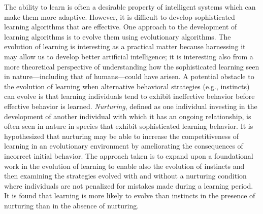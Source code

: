 The ability to learn is often a desirable property of intelligent systems which can make them more adaptive.
However, it is difficult to develop sophisticated learning algorithms that are effective.
One approach to the development of learning algorithms is to evolve them using evolutionary algorithms.
The evolution of learning is interesting as a practical matter because harnessing it may allow us to develop better artificial intelligence;
it is interesting also from a more theoretical perspective of understanding how the sophisticated learning seen in nature---including that of humans---could have arisen.
A potential obstacle to the evolution of learning when alternative behavioral strategies (e.g., instincts) can evolve is that learning individuals tend to exhibit ineffective behavior before effective behavior is learned.
\emph{Nurturing}, defined as one individual investing in the development of another individual with which it has an ongoing relationship, is often seen in nature in species that exhibit sophisticated learning behavior.
It is hypothesized that nurturing may be able to increase the competitiveness of learning in an evolutionary environment by ameliorating the consequences of incorrect initial behavior.
The approach taken is to expand upon a foundational work in the evolution of learning to enable also the evolution of instincts and then examining the strategies evolved with and without a nurturing condition where individuals are not penalized for mistakes made during a learning period.
It is found that learning is more likely to evolve than instincts in the presence of nurturing than in the absence of nurturing.